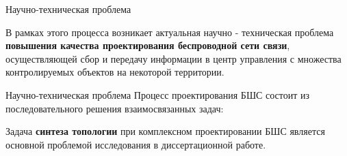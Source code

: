 
\begin{frame}
    {Научно-техническая проблема}
    \justifying

    В рамках этого процесса возникает актуальная научно - техническая проблема \textbf{повышения качества проектирования беспроводной сети связи}, осуществляющей сбор и передачу информации в центр  управления с множества контролируемых объектов на некоторой территории. 

\end{frame}


\begin{frame}
    {Научно-техническая проблема}
    Процесс проектирования БШС состоит из последовательного решения взаимосвязанных задач:
    
    \bigskip

        



    \bigskip
    
    Задача \textbf{синтеза топологии} при комплексном проектировании БШС является основной проблемой исследования в диссертационной работе.

\end{frame}


